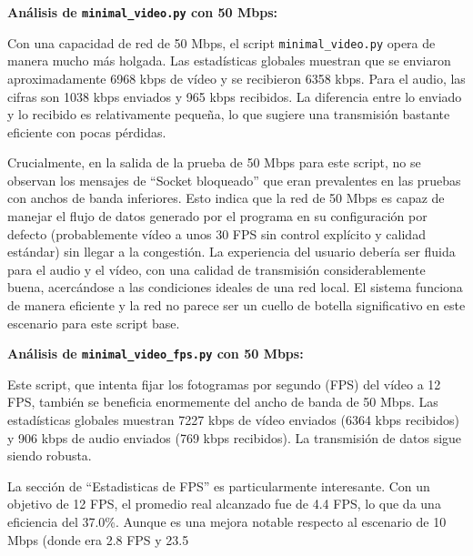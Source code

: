 \vspace{\baselineskip}

\textbf{Análisis de \texttt{minimal\_video.py} con 50 Mbps:}

Con una capacidad de red de 50 Mbps, el script \texttt{minimal\_video.py} opera de manera mucho más holgada. Las estadísticas globales muestran que se enviaron aproximadamente 6968 kbps de vídeo y se recibieron 6358 kbps. Para el audio, las cifras son 1038 kbps enviados y 965 kbps recibidos. La diferencia entre lo enviado y lo recibido es relativamente pequeña, lo que sugiere una transmisión bastante eficiente con pocas pérdidas.

Crucialmente, en la salida de la prueba de 50 Mbps para este script, no se observan los mensajes de ``Socket bloqueado'' que eran prevalentes en las pruebas con anchos de banda inferiores. Esto indica que la red de 50 Mbps es capaz de manejar el flujo de datos generado por el programa en su configuración por defecto (probablemente vídeo a unos 30 FPS sin control explícito y calidad estándar) sin llegar a la congestión. La experiencia del usuario debería ser fluida para el audio y el vídeo, con una calidad de transmisión considerablemente buena, acercándose a las condiciones ideales de una red local. El sistema funciona de manera eficiente y la red no parece ser un cuello de botella significativo en este escenario para este script base.

\vspace{\baselineskip}

\textbf{Análisis de \texttt{minimal\_video\_fps.py} con 50 Mbps:}

Este script, que intenta fijar los fotogramas por segundo (FPS) del vídeo a 12 FPS, también se beneficia enormemente del ancho de banda de 50 Mbps. Las estadísticas globales muestran 7227 kbps de vídeo enviados (6364 kbps recibidos) y 906 kbps de audio enviados (769 kbps recibidos). La transmisión de datos sigue siendo robusta.

La sección de ``Estadisticas de FPS'' es particularmente interesante. Con un objetivo de 12 FPS, el promedio real alcanzado fue de 4.4 FPS, lo que da una eficiencia del 37.0\%. Aunque es una mejora notable respecto al escenario de 10 Mbps (donde era 2.8 FPS y 23.5%

